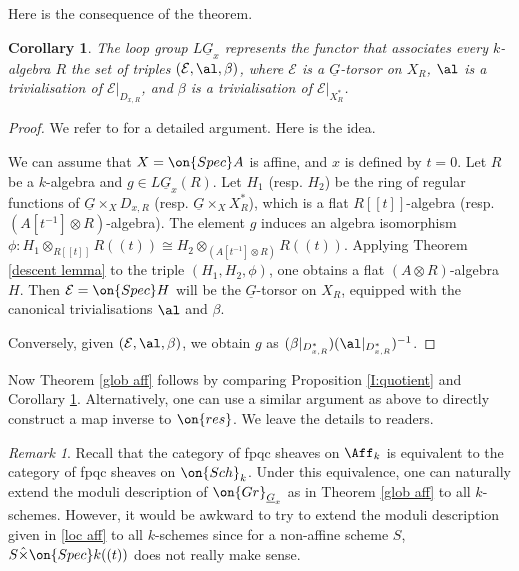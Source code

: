 \documentclass[]{pcmi}
\theoremstyle{plain}
\newtheorem{cor}[equation]{Corollary}
\theoremstyle{remark}
\newtheorem{rmk}[equation]{Remark}
\theoremstyle{definition}
\newcommand{\mE}{{\mathcal E}}
\newcommand{\Gr}{{\on{Gr}}}
\newcommand{\Spec}{\on{Spec}}
\begin{document}
Here is the consequence of the theorem.
\begin{cor}\label{global interpretation of loop}
The loop group $L\underline G_x$ represents the functor that associates every $k$-algebra $R$ the set of triples $(\mE,\al,\beta)$, where $\mE$ is a $\underline G$-torsor on $X_R$, $\al$ is a trivialisation of $\mE|_{D_{x,R}}$, and $\beta$ is a trivialisation of $\mE|_{X^*_R}$. 
\end{cor}
\begin{proof}We refer to \cite[Lemma 6.1]{PZ} for a detailed argument. Here is the idea. 

We can assume that $X=\Spec A$ is affine, and $x$ is defined by $t=0$. Let $R$ be a $k$-algebra and $g\in L\underline G_x(R)$. 
Let $H_1$ (resp. $H_2$) be the ring of regular functions of $\underline G\times_X D_{x,R}$ (resp. $\underline G\times_XX^*_R$), which is a flat $R[[t]]$-algebra (resp. $(A[t^{-1}]\otimes R)$-algebra). The element $g$ induces an algebra isomorphism  $\phi:H_1\otimes_{R[[t]]} R((t))\cong H_2 \otimes_{(A[t^{-1}]\otimes R)} R((t))$.
Applying Theorem \ref{descent lemma} to the triple $(H_1,H_2,\phi)$, one obtains a flat $(A\otimes R)$-algebra $H$. Then $\mE=\Spec H$ will be the $\underline G$-torsor on $X_R$, equipped with the canonical trivialisations $\al$ and $\beta$. 

Conversely, given $(\mE,\al,\beta)$, we obtain $g$ as $(\beta|_{D_{x,R}^*})(\al|_{D_{x,R}^*})^{-1}$.
\end{proof}

Now Theorem \ref{glob aff} follows by comparing Proposition \ref{I:quotient} and Corollary \ref{global interpretation of loop}. Alternatively, one can use a similar argument as above to directly construct a map inverse to $\on{res}$. We leave the details to readers.

\begin{rmk}Recall that the category of fpqc sheaves on $\Aff_k$ is equivalent to the category of fpqc sheaves on $\on{Sch}_k$. Under this equivalence, one can naturally extend the moduli description of $\Gr_{\underline G_x}$ as in Theorem \ref{glob aff} to all $k$-schemes. However, it would be awkward to try to extend the moduli description given in \eqref{loc aff} to all $k$-schemes since for a non-affine scheme $S$, $S\hat{\times} \Spec k((t))$ does not really make sense.
\end{rmk}
\end{document}
